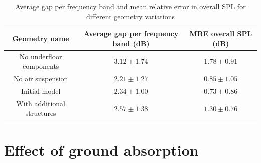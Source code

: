 \begin{table}[H]
	\centering
	\caption{Average gap per frequency band and mean relative error in overall SPL for different geometry variations}
	\begin{tabular}{c|c|c}
		Geometry name              & Average gap per frequency band (dB) & MRE overall SPL (dB) \\ \hline
		No underfloor components   & $3.12\pm1.74$                       & $1.78\pm0.91$        \\
		No air suspension          & $2.21\pm1.27$                       & $0.85\pm1.05$        \\
		Initial model              & $2.34\pm1.00$                       & $0.73\pm0.86$        \\
		With additional structures & $2.57\pm1.38$                       & $1.30\pm0.76$       
	\end{tabular}
\end{table}


\section{Effect of ground absorption}

